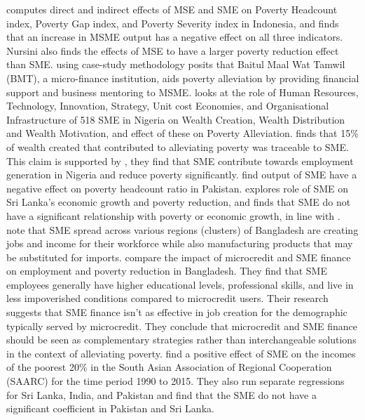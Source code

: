 \documentclass [12pt]{article}
\begin{document}
\textcite{nursini2020msmes} computes direct and indirect effects of MSE and SME on Poverty Headcount index, Poverty Gap index, and Poverty Severity index in Indonesia, and finds that an increase in MSME output has a negative effect on all three indicators. Nursini also finds the effects of MSE to have a larger poverty reduction effect than SME. \textcite{yuniar2015development} using case-study methodology posits that Baitul Maal Wat Tamwil (BMT), a micro-finance institution,  aids poverty alleviation by providing financial support and business mentoring to MSME. \textcite{asikhia2016smes} looks at the role of Human Resources, Technology, Innovation, Strategy, Unit cost Economies, and Organisational Infrastructure of 518 SME in Nigeria on Wealth Creation, Wealth Distribution and Wealth Motivation, and effect of these on Poverty Alleviation. \textcite{asikhia2016smes} finds that  15\% of wealth created that contributed to alleviating poverty was traceable  to  SME. This claim is supported by \textcite{kowo2019role}, they find that SME contribute towards employment generation in Nigeria and reduce poverty significantly.
\textcite{ali2014role} find output of SME have a negative effect on poverty headcount ratio in Pakistan. \textcite{vijayakumar2013empirical} explores role of SME on Sri Lanka's economic growth and poverty reduction, and finds that SME do not have a significant relationship with poverty or economic growth, in line with \textcite{manzoor2019role}.  \textcite{begum2015employment} note that SME spread across various regions (clusters) of Bangladesh are creating jobs and income for their workforce while also manufacturing products that may be substituted for imports. \textcite{BAUCHET2013288} compare the impact of microcredit and SME finance on employment and poverty reduction in Bangladesh. They find that SME employees generally have higher educational levels, professional skills, and live in less impoverished conditions compared to microcredit users. Their research suggests that SME finance isn't as effective in job creation for the demographic typically served by microcredit. They conclude that microcredit and SME finance should be seen as complementary strategies rather than interchangeable solutions in the context of alleviating poverty. 
\textcite{manzoor2019role} find a positive effect of SME on the incomes of the poorest 20\% in the South Asian Association of Regional Cooperation (SAARC) for the time period 1990 to 2015. They also run separate regressions for Sri Lanka, India, and Pakistan and find that the SME do not have a significant coefficient in Pakistan and Sri Lanka.
\end{document}
